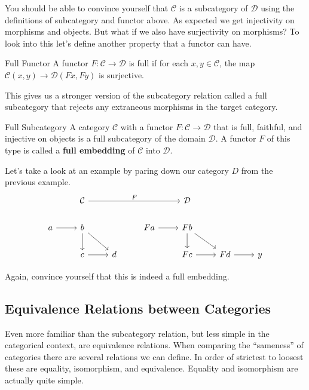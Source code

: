 \documentclass[12pt]{article}
\newcounter{examp}
\begin{document}
You should be able to convince yourself that $\mathcal{C}$ is a subcategory of $\mathcal{D}$ using the definitions of subcategory and functor above.
As expected we get injectivity on morphisms and objects.
But what if we also have surjectivity on morphisms?
To look into this let's define another property that a functor can have.

\begin{definition}{Full Functor}{}
    A functor $F:\mathcal{C}\rightarrow\mathcal{D}$ is full if for each $x,y\in\mathcal{C}$, the map $\mathcal{C}(x, y)\rightarrow\mathcal{D}(Fx,Fy)$ is surjective.
\end{definition}

This gives us a stronger version of the subcategory relation called a full subcategory that rejects any extraneous morphisms in the target category.

\begin{definition}{Full Subcategory}{}
    A category $\mathcal{C}$ with a functor $F:\mathcal{C}\rightarrow\mathcal{D}$ that is full, faithful, and injective on objects is a full subcategory of the domain $\mathcal{D}$.
    A functor $F$ of this type is called a \textbf{full embedding} of $\mathcal{C}$ into $\mathcal{D}$.
\end{definition}

Let's take a look at an example by paring down our category $D$ from the previous example.
\[\begin{tikzcd}
        & {\mathcal{C}} &&& {\mathcal{D}} \\
        a & b && Fa & Fb \\
        & c & d && Fc & Fd & y
        \arrow["F", from=1-2, to=1-5]
        \arrow[from=2-1, to=2-2]
        \arrow[from=2-2, to=3-2]
        \arrow[from=2-2, to=3-3]
        \arrow[from=2-4, to=2-5]
        \arrow[from=2-5, to=3-5]
        \arrow[from=2-5, to=3-6]
        \arrow[from=3-2, to=3-3]
        \arrow[from=3-5, to=3-6]
        \arrow[from=3-6, to=3-7]
    \end{tikzcd}\]

Again, convince yourself that this is indeed a full embedding.



\subsection*{Equivalence Relations between Categories}
Even more familiar than the subcategory relation, but less simple in the categorical context, are equivalence relations.
When comparing the ``sameness'' of categories there are several relations we can define.
In order of strictest to loosest these are equality, isomorphism, and equivalence.
Equality and isomorphism are actually quite simple.
\end{document}
